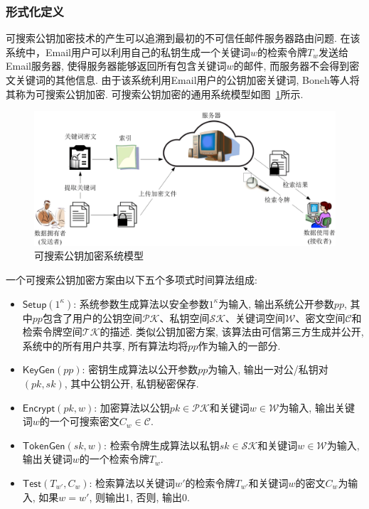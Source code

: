 \subsubsection{形式化定义}
可搜索公钥加密技术的产生可以追溯到最初的不可信任邮件服务器路由问题. 在该系统中，Email用户可以利用自己的私钥生成一个关键词$w$的检索令牌$T_w$发送给Email服务器, 使得服务器能够返回所有包含关键词$w$的邮件, 而服务器不会得到密文关键词的其他信息. 由于该系统利用Email用户的公钥加密关键词, Boneh等人将其称为可搜索公钥加密. 可搜索公钥加密的通用系统模型如图~\ref{fig:ch6-PEKSModel}所示.
\begin{figure}[h]
\centering
\includegraphics[scale=0.8]{figure/ch6-PEKSModel.png}
\caption{可搜索公钥加密系统模型} \label{fig:ch6-PEKSModel}
\end{figure}

\begin{definition} [可搜索公钥加密]
一个可搜索公钥加密方案由以下五个多项式时间算法组成: 
\begin{itemize}
\item $\mathsf{Setup}(1^\kappa)$: 系统参数生成算法以安全参数$1^\kappa$为输入, 输出系统公开参数$pp$, 其中$pp$包含了用户的公钥空间$\mathcal{PK}$、私钥空间$\mathcal{SK}$、关键词空间$\mathcal{W}$、密文空间$\mathcal{C}$和检索令牌空间$\mathcal{TK}$的描述. 类似公钥加密方案, 该算法由可信第三方生成并公开, 系统中的所有用户共享, 所有算法均将$pp$作为输入的一部分.

\item $\mathsf{KeyGen}(pp)$: 密钥生成算法以公开参数$pp$为输入, 输出一对公/私钥对$(pk, sk)$, 其中公钥公开, 私钥秘密保存.

\item $\mathsf{Encrypt}(pk, w)$: 加密算法以公钥$pk \in \mathcal{PK}$和关键词$w \in \mathcal{W}$为输入, 输出关键词$w$的一个可搜索密文$C_w \in \mathcal{C}$.

\item $\mathsf{TokenGen}(sk, w)$: 检索令牌生成算法以私钥$sk \in \mathcal{SK}$和关键词$w \in \mathcal{W}$为输入, 输出关键词$w$的一个检索令牌$T_w$.

\item $\mathsf{Test}(T_{w'}, C_w)$: 检索算法以关键词$w'$的检索令牌$T_{w'}$和关键词$w$的密文$C_w$为输入, 如果$w = w'$, 则输出1, 否则, 输出0.
\end{itemize}
\end{definition}

